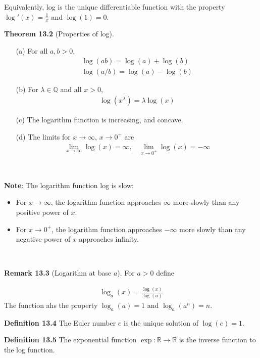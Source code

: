 \documentclass[11pt]{article}
\begin{document}
Equivalently, log is the unique differentiable function with the property $\log'(x) = \frac{1}{x}$ and $\log (1) = 0$.

\textbf{Theorem 13.2} (Properties of log). 

\begin{enumerate}
    \item [(a)] For all $a, b > 0$, 
    \begin{align*}
        \log(ab) = \log(a) + \log(b) \\
        \log(a/b) = \log(a) - \log(b) 
    \end{align*}
    
    \item [(b)] For $\lambda \in \mathbb{Q}$ and all $x > 0$, 
    \begin{align*}
        \log(x^\lambda) = \lambda \log(x)
    \end{align*}
    
    \item [(c)] The logarithm function is increasing, and concave.
    
    \item [(d)] The limits for $x \to \infty$, $x \to 0^+$ are
    \begin{align*}
        \lim_{x \to \infty} \log(x) = \infty, ~~~~ \lim_{x \to 0^+} \log(x) = - \infty
    \end{align*}
\end{enumerate} 
\ 

\textbf{Note}: The logarithm function log is slow:
\begin{itemize}
    \item For $x \to \infty$, the logarithm function approaches $\infty$ more slowly than any positive power of $x$. 
    
    \item For $x \to0^+$, the logarithm function approaches $-\infty$ more slowly than any negative power of $x$ approaches infinity. 
\end{itemize} 
\ 

\textbf{Remark 13.3} (Logarithm at base $a$). For $a>0$ define

\begin{align*}
    \log_a(x) = \frac{\log(x)}{\log(a)}
\end{align*}
The function ahs the property $\log_a(a) = 1$ and $\log_a(a^n) = n$.

\textbf{Definition 13.4} The Euler number $e$ is the unique solution of $\log(e) = 1$.

\textbf{Definition 13.5} The exponential function $\exp: \mathbb{R} \to \mathbb{R}$ is the inverse function to the log function.
\end{document}
